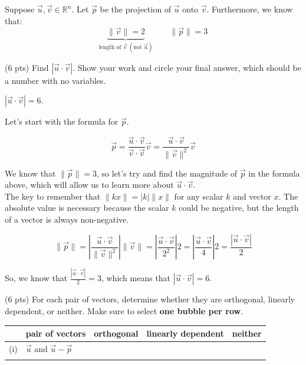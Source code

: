 \documentclass[11pt]{article}
\begin{document}
\begin{prob}[(12 pts)]
Suppose $\vec u, \vec v \in \mathbb{R}^n$. Let $\vec p$ be the projection of $\vec u$ onto $\vec v$. Furthermore, we know that:
$$\underbrace{\lVert \vec v \rVert = 2}_{\text{length of } \vec v \: (\text{not } \vec u)} \qquad \lVert \vec p \rVert = 3$$

\begin{subprob}(6 pts) Find $| \vec u \cdot \vec v |$. Show your work and $\boxed{\text{circle}}$ your final answer, which should be a number with no variables. \\

\emptybox{12cm}

\begin{solution}
$|\vec u \cdot \vec v| = 6$.

Let's start with the formula for $\vec p$.

$$\vec p = \frac{\vec u \cdot \vec v}{\vec v \cdot \vec v} \vec v = \frac{\vec u \cdot \vec v}{\lVert \vec v \rVert^2} \vec v$$

We know that $\lVert \vec p \rVert = 3$, so let's try and find the magnitude of $\vec p$ in the formula above, which will allow us to learn more about $\vec u \cdot \vec v$. \\

The key to remember that $\lVert k x \rVert = |k| \lVert x \rVert$ for any scalar $k$ and vector $x$. The absolute value is necessary because the scalar $k$ could be negative, but the length of a vector is always non-negative.

$$\lVert \vec p \rVert = \left| \frac{\vec u \cdot \vec v}{\lVert \vec v \rVert^2} \right| \lVert \vec v \rVert = \left| \frac{\vec u \cdot \vec v}{2^2} \right| 2 = \left| \frac{\vec u \cdot \vec v}{4} \right| 2 = \frac{\left| \vec u \cdot \vec v \right|}{2}$$

So, we know that $\frac{\left| \vec u \cdot \vec v \right|}{2} = 3$, which means that $\boxed{\left| \vec u \cdot \vec v \right| = 6}$.

\end{solution}

\end{subprob}

\begin{subprob}(6 pts) For each pair of vectors, determine whether they are orthogonal, linearly dependent, or neither. Make sure to select \textbf{one bubble per row}. \\

\begin{tabular}{|c|l|c|c|c|}
\hline
    & pair of vectors & orthogonal & linearly dependent & neither \\
\hline
(i) & $\vec u$ and $\vec u - \vec p$        & \bubble{} & \bubble{} & \correctbubble{} \\
\hline
\rule{0pt}{2.5ex} %


\end{tabular}
\end{subprob}
\end{prob}
\end{document}

